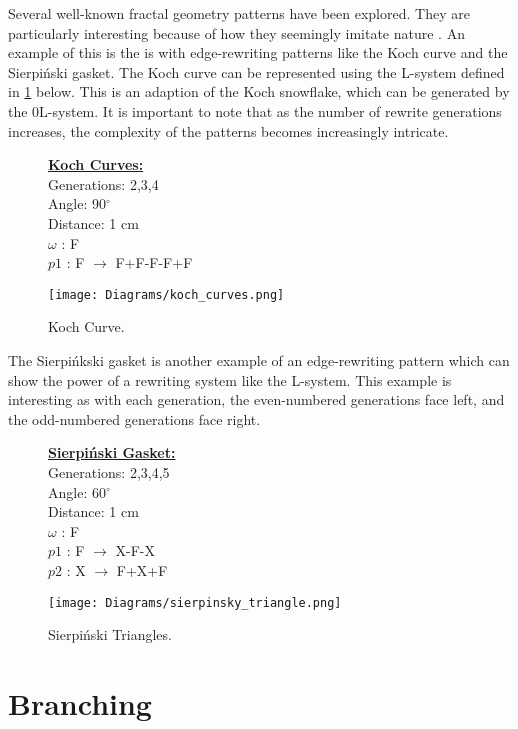 Several well-known fractal geometry patterns have been explored. They are particularly interesting because of how they seemingly imitate nature \cite{mandelbrot1982fractal}. An example of this is the is with edge-rewriting patterns like the Koch curve and the Sierpi\'{n}ski gasket. The Koch curve can be represented using the L-system defined in \ref{KochSnowflake} below. This is an adaption of the Koch snowflake, which can be generated by the 0L-system. It is important to note that as the number of rewrite generations increases, the complexity of the patterns becomes increasingly intricate.

\begin{figure}[htbp]
	\raggedright
	\textbf{\underline{Koch Curves:}} \\
	Generations: 2,3,4\\
	Angle: 90$^\circ$\\
	Distance: 1 cm\\
	$\omega$ : F \\
	$p1$ : F $\rightarrow$ F+F-F-F+F\\
	{\centering
		\vspace{7px}
		\texttt{[image: Diagrams/koch\_curves.png]}
		\caption{Koch Curve.} \label{KochSnowflake}
	}
\end{figure}
\FloatBarrier

\noindent
The Sierpi\'{n}kski gasket is another example of an edge-rewriting pattern which can show the power of a rewriting system like the L-system. This example is interesting as with each generation, the even-numbered generations face left, and the odd-numbered generations face right.


\begin{figure}[htbp]
	\raggedright
	\textbf{\underline{Sierpi\'{n}ski Gasket:}} \\
	Generations: 2,3,4,5\\
	Angle: 60$^\circ$\\
	Distance: 1 cm\\
	$\omega$ : F\\
	$p1$ : F $\rightarrow$ X-F-X\\
	$p2$ : X $\rightarrow$ F+X+F\\
	{\centering
		\vspace{7px}
		\texttt{[image: Diagrams/sierpinsky\_triangle.png]}
		\caption{Sierpi\'{n}ski Triangles.}
	}
\end{figure}
\FloatBarrier

\section{Branching} \label{branching}


